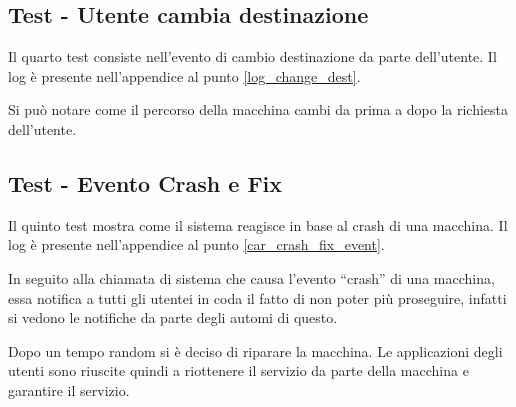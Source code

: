 \subsection{Test - Utente cambia destinazione}
Il quarto test consiste nell'evento di cambio destinazione da parte dell'utente. Il log è presente nell'appendice al punto \ref{log_change_dest}.

Si può notare come il percorso della macchina cambi da prima a dopo la richiesta dell'utente.

\subsection{Test - Evento Crash e Fix}
Il quinto test mostra come il sistema reagisce in base al crash di una macchina. Il log è presente nell'appendice al punto \ref{car_crash_fix_event}.

In seguito alla chiamata di sistema che causa l'evento ``crash'' di una macchina, essa notifica a tutti gli utentei in coda il fatto di non poter più proseguire, infatti si vedono le notifiche da parte degli automi di questo. 

Dopo un tempo random si è deciso di riparare la macchina. Le applicazioni degli utenti sono riuscite quindi a riottenere il servizio da parte della macchina e garantire il servizio.